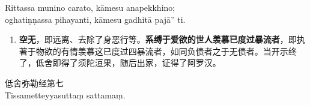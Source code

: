 Rittassa munino carato, kāmesu anapekkhino;\\
oghatiṇṇassa pihayanti, kāmesu gadhitā pajā” ti. %

\begin{enumerate}\item \textbf{空无}，即远离、去除了身恶行等。\textbf{系缚于爱欲的世人羡慕已度过暴流者}，即执著于物欲的有情羡慕这已度过四暴流者，如同负债者之于无债者。当开示终了，低舍即得了须陀洹果，随后出家，证得了阿罗汉。\end{enumerate}

\begin{center}\vspace{1em}低舍弥勒经第七\\Tissametteyyasuttaṃ sattamaṃ.\end{center}
